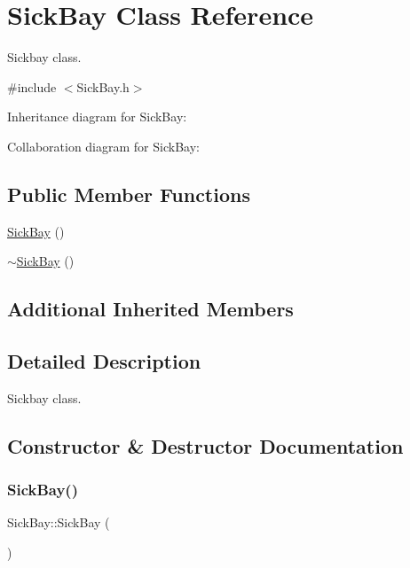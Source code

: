 \hypertarget{classSickBay}{}\section{Sick\+Bay Class Reference}
\label{classSickBay}


Sickbay class.  




{\ttfamily \#include $<$Sick\+Bay.\+h$>$}



Inheritance diagram for Sick\+Bay\+:


Collaboration diagram for Sick\+Bay\+:
\subsection*{Public Member Functions}
\begin{DoxyCompactItemize}
\item 
\hyperlink{classSickBay_a6deba7260251b077d29cabb75587f9c6}{Sick\+Bay} ()
\item 
\hyperlink{classSickBay_a527219ede6b1a75938fef90ecc0b7755}{$\sim$\+Sick\+Bay} ()
\end{DoxyCompactItemize}
\subsection*{Additional Inherited Members}


\subsection{Detailed Description}
Sickbay class. 

\subsection{Constructor \& Destructor Documentation}
\mbox{\label{classSickBay_a6deba7260251b077d29cabb75587f9c6}} 
\subsubsection{\texorpdfstring{Sick\+Bay()}{SickBay()}}
{\footnotesize\ttfamily Sick\+Bay\+::\+Sick\+Bay (\begin{DoxyParamCaption}{ }\end{DoxyParamCaption})}

